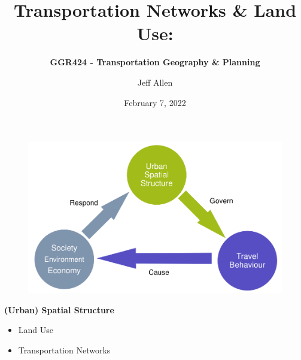 \documentclass[aspectratio=169]{beamer}
\title{\textbf{Transportation Networks \& Land Use:}}
\subtitle{\textbf{GGR424 - Transportation Geography \& Planning}}
\author{Jeff Allen}
\institute{University of Toronto}
\date{February 7, 2022}
\begin{document}
	
\begin{frame}
	\titlepage	
\end{frame}



\begin{frame}

	\begin{figure}
		\centering
		\includegraphics[width=0.76\linewidth]{images/big_links.png}
	\end{figure}
	
	\textbf{(Urban) Spatial Structure}
	\begin{itemize}
		\item Land Use
		\item Transportation Networks	
	\end{itemize}
	
\end{frame}
\end{document}
